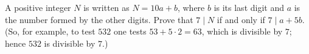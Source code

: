 A positive integer $N$ is written as $N=10a+b$, where $b$ is its last digit and $a$ is the number formed by the other digits. Prove that $7\mid N$ if and only if $7\mid a+5b$. (So, for example, to test $532$ one tests $53+5\cdot2=63$, which is divisible by $7$; hence $532$ is divisible by $7$.)
